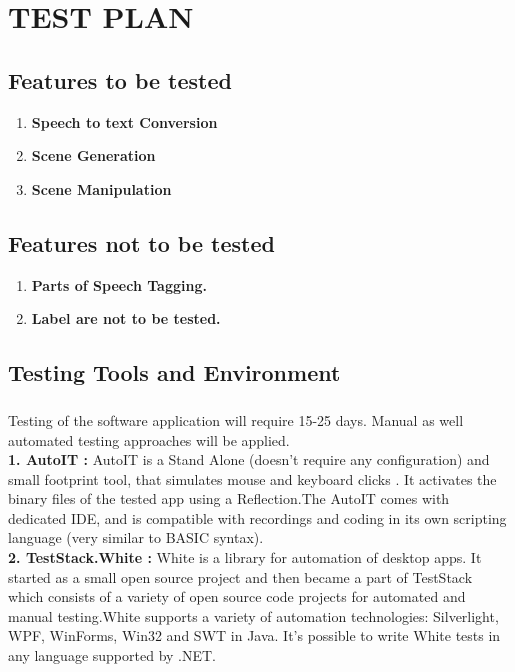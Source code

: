 \documentclass[12pt,a4paper,final,oneside]{report}
\begin{document}
\chapter{TEST PLAN}

\section{ Features to be tested }
\begin{enumerate}
\item \textbf{Speech to text Conversion}
\item \textbf{Scene Generation}
\item \textbf{Scene Manipulation }
\end{enumerate}

\section{Features not to be tested}
\begin{enumerate}
\item \textbf{Parts of Speech Tagging.}
\item \textbf{Label are not to be tested.}
\end{enumerate}

\section{Testing Tools and Environment}
\paragraph{}Testing of the software application will require 15-25 days. Manual as well automated testing approaches will be applied.\\
\textbf{1. AutoIT : }AutoIT is a Stand Alone (doesn’t require any configuration) and small footprint tool, that simulates mouse and keyboard clicks . It activates the binary files of the tested app using a Reflection.\linebreak The AutoIT comes with dedicated IDE, and is compatible with recordings and coding in its own scripting language (very similar to BASIC syntax). \\

\textbf{2. TestStack.White : }White is a library for automation of desktop apps. It started as a small open source project and then became a part of TestStack which consists of a variety of open source code projects for automated and manual testing.\linebreak White supports a variety of automation technologies: Silverlight, WPF, WinForms, Win32 and SWT in Java. It’s possible to write White tests in any language supported by .NET.\\\\
\end{document}
